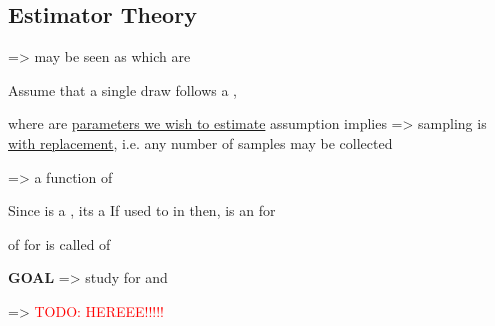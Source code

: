 \subsection*{Estimator Theory}

  =>
may be seen as   which are 
\begin{enumerate}
    \vItem Assume that a single draw  follows a  ,

    \vItem where  are \ul{parameters we wish to estimate}
    \vItem {} assumption implies => sampling is \ul{with replacement},
    i.e. any number of samples  may be collected
\end{enumerate}

\hSep

  => a function of  
\begin{enumerate}
    \vItem Since  is a , its a 
    \vItem If  used to  in \iMbox{\theta} then,
     is an  for \iMbox{\theta}
    \begin{enumerate}
        \vItem {}  of  for   is called  of \iMbox{\theta}
    \end{enumerate}
    \vItem \textbf{GOAL} => study   
    for   and 
\end{enumerate}

\hSep

 => \textcolor{red}{TODO: HEREEE!!!!!}

\hSep

